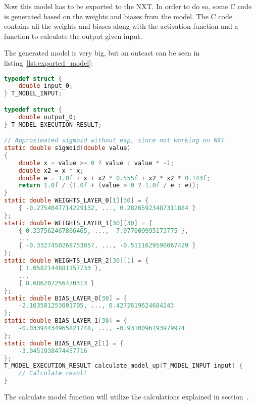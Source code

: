 Now this model has to be exported to the NXT. 
In order to do so, some C code is generated based on the weights and biases from the model.
The C code contains all the weights and biases along with the activation function and a function to calculate the output given input.

The generated model is very big, but an outcast can be seen in listing~\ref{lst:exported_model}:


\begin{lstlisting}[language=C,label={lst:exported_model},caption={Exported model for getting power to move up}]
typedef struct {
	double input_0;
} T_MODEL_INPUT;

typedef struct {
	double output_0;
} T_MODEL_EXECUTION_RESULT;

// Approximated sigmoid without exp, since not working on NXT
static double sigmoid(double value)
{
	double x = value >= 0 ? value : value * -1;
	double x2 = x * x;
	double e = 1.0f + x + x2 * 0.555f + x2 * x2 * 0.143f;
	return 1.0f / (1.0f + (value > 0 ? 1.0f / e : e));
}
static double WEIGHTS_LAYER_0[1][30] = {
	{ -0.2754047714229132, ..., 0.28265923487311884 }
};
static double WEIGHTS_LAYER_1[30][30] = {
	{ 0.337562467866465, ..., -7.977009995173775 },
	...
	{ -0.3327450268753057, ..., -0.5111629590067429 }
};
static double WEIGHTS_LAYER_2[30][1] = {
	{ 1.0582144881157733 },
	...
	{ 8.686207256470313 }
};
static double BIAS_LAYER_0[30] = {
	-2.163581253001705, ..., 0.4272619624684243
};
static double BIAS_LAYER_1[30] = {
	-0.03394434965821748, ..., -0.9310096193979974
};
static double BIAS_LAYER_2[1] = {
	-3.0451938474457716
};
T_MODEL_EXECUTION_RESULT calculate_model_up(T_MODEL_INPUT input) {
	// Calculate result
}

\end{lstlisting}

The calculate model function will utilize the calculations explained in section~.


